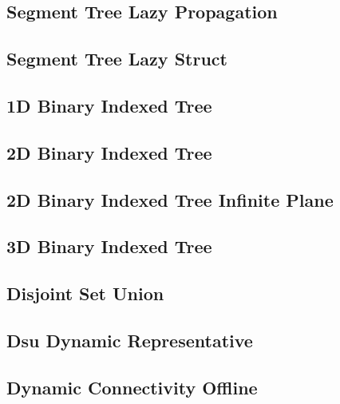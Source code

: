 \documentclass[10pt]{article}
\begin{document}
\subsection{\texorpdfstring{{Segment Tree Lazy Propagation}}{{Segment Tree Lazy Propagation}}}

\subsection{\texorpdfstring{{Segment Tree Lazy Struct}}{{Segment Tree Lazy Struct}}}

\subsection{\texorpdfstring{{1D Binary Indexed Tree}}{{1D Binary Indexed Tree}}}

\subsection{\texorpdfstring{{2D Binary Indexed Tree}}{{2D Binary Indexed Tree}}}

\subsection{\texorpdfstring{{2D Binary Indexed Tree Infinite Plane}}{{2D Binary Indexed Tree Infinite Plane}}}

\subsection{\texorpdfstring{{3D Binary Indexed Tree}}{{3D Binary Indexed Tree}}}

\subsection{\texorpdfstring{{Disjoint Set Union}}{{Disjoint Set Union}}}

\subsection{\texorpdfstring{{Dsu Dynamic Representative}}{{Dsu Dynamic Representative}}}

\subsection{\texorpdfstring{{Dynamic Connectivity Offline}}{{Dynamic Connectivity Offline}}}

\end{document}
